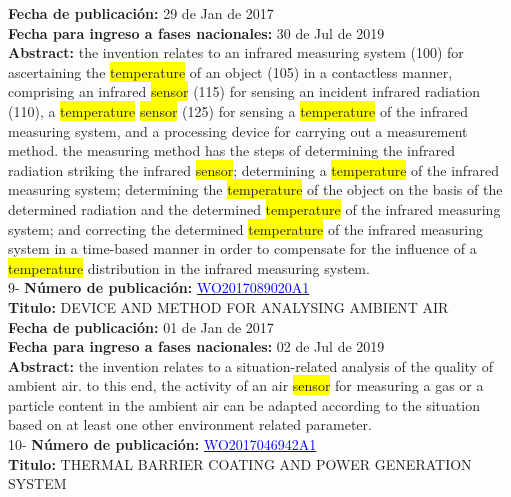 \textbf{Fecha de publicación:} 29 de Jan de 2017\\ 
\textbf{Fecha para ingreso a fases nacionales:} 30 de Jul de 2019\\ 
\textbf{Abstract:} the invention relates to an infrared measuring system (100) for ascertaining the \colorbox{yellow}{temperature} of an object (105) in a contactless manner, comprising an infrared \colorbox{yellow}{sensor} (115) for sensing an incident infrared radiation (110), a \colorbox{yellow}{temperature} \colorbox{yellow}{sensor} (125) for sensing a \colorbox{yellow}{temperature} of the infrared measuring system, and a processing device for carrying out a measurement method. the measuring method has the steps of determining the infrared radiation striking the infrared \colorbox{yellow}{sensor}; determining a \colorbox{yellow}{temperature} of the infrared measuring system; determining the \colorbox{yellow}{temperature} of the object on the basis of the determined radiation and the determined \colorbox{yellow}{temperature} of the infrared measuring system; and correcting the determined \colorbox{yellow}{temperature} of the infrared measuring system in a time-based manner in order to compensate for the influence of a \colorbox{yellow}{temperature} distribution in the infrared measuring system.\\ 
 

 \vspace{1cm}9- \textbf{Número de publicación:} \href{https://worldwide.espacenet.com/publicationDetails/biblio?DB=EPODOC&II=0&ND=3&adjacent=true&locale=en_EP&FT=D&date=20160331&CC=WO&NR=2017089020A1&KC=A1#}{\textcolor{blue}{WO2017089020A1}}\\ 
\textbf{Titulo:} DEVICE AND METHOD FOR ANALYSING AMBIENT AIR\\ 
 
\textbf{Fecha de publicación:} 01 de Jan de 2017\\ 
\textbf{Fecha para ingreso a fases nacionales:} 02 de Jul de 2019\\ 
\textbf{Abstract:} the invention relates to a situation-related analysis of the quality of ambient air. to this end, the activity of an air \colorbox{yellow}{sensor} for measuring a gas or a particle content in the ambient air can be adapted according to the situation based on at least one other environment related parameter.\\ 
 

 \vspace{1cm}10- \textbf{Número de publicación:} \href{https://worldwide.espacenet.com/publicationDetails/biblio?DB=EPODOC&II=0&ND=3&adjacent=true&locale=en_EP&FT=D&date=20160331&CC=WO&NR=2017046942A1&KC=A1#}{\textcolor{blue}{WO2017046942A1}}\\ 
\textbf{Titulo:} THERMAL BARRIER COATING AND POWER GENERATION SYSTEM\\ 
 
